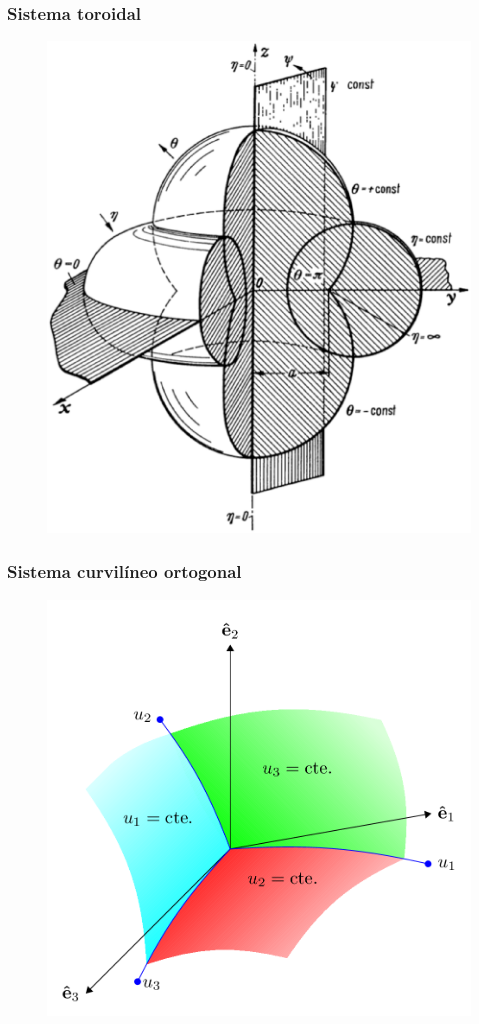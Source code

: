 \documentclass[12pt]{beamer}
\begin{document}
\begin{frame}
\frametitle{Sistema toroidal}
\begin{figure}
  \centering
  \includegraphics[scale=0.25]{Imagenes/Sistema_Toroidal.eps}
\end{figure}
\end{frame}
\begin{frame}
\frametitle{Sistema curvilíneo ortogonal}
\begin{figure}
  \centering
  \includegraphics[scale=0.2]{Imagenes/Sistema_Curvilineo_Ortogonal.png}
\end{figure}
\end{frame}
\end{document}
